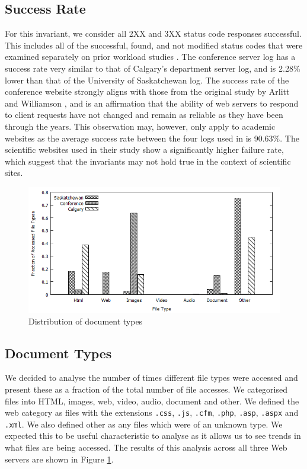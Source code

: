 \documentclass[10pt,conference]{IEEEtran}
\begin{document}
\subsection{Success Rate} %
\label{sub:success_rate}
For this invariant, we consider all 2XX and 3XX status code responses successful. This includes all of the successful, found, and not modified status codes that were examined separately on prior workload studies \cite{keynote, Faber}. The conference server log has a success rate very similar to that of Calgary’s department server log, and is 2.28\% lower than that of the University of Saskatchewan log. The success rate of the conference website strongly aligns with those from the original study by Arlitt and Williamson \cite{keynote}, and is an affirmation that the ability of web servers to respond to client requests have not changed and remain as reliable as they have been through the years. This observation may, however, only apply to academic websites as the average success rate between the four logs used in \cite{keynote, Faber} is 90.63\%. The scientific websites used in their study show a significantly higher failure rate, which suggest that the invariants may not hold true in the context of scientific sites.

\begin{figure}
    \includegraphics{images/filetype}
    \caption{Distribution of document types}\label{fig:file_types}
\end{figure}

\subsection{Document Types}\label{sub:doc_types}
We decided to analyse the number of times different file types were accessed and present these as a fraction of the total number of file accesses. We categorised files into HTML, images, web, video, audio, document and other. We defined the web category as files with the extensions \texttt{.css}, \texttt{.js}, \texttt{.cfm}, \texttt{.php}, \texttt{.asp}, \texttt{.aspx} and \texttt{.xml}. We also defined other as any files which were of an unknown type. We expected this to be useful characteristic to analyse as it allows us to see trends in what files are being accessed. The results of this analysis across all three Web servers are shown in Figure \ref{fig:file_types}.
\end{document}
